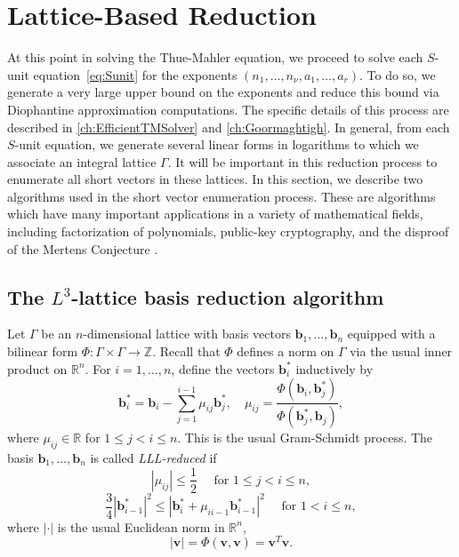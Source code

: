 \section{Lattice-Based Reduction}
\label{sec:LatticeReduction}


At this point in solving the Thue-Mahler equation, we proceed to solve each $S$-unit equation~\eqref{eq:Sunit} for the exponents $(n_1, \dots, n_{\nu}, a_1, \dots, a_r)$. To do so, we generate a very large upper bound on the exponents and reduce this bound via Diophantine approximation computations. The specific details of this process are described in \autoref{ch:EfficientTMSolver} and \autoref{ch:Goormaghtigh}. In general, from each $S$-unit equation, we generate several linear forms in logarithms to which we associate an integral lattice $\Gamma$. It will be important in this reduction process to enumerate all short vectors in these lattices. In this section, we describe two algorithms used in the short vector enumeration process. These are algorithms which have many important applications in a variety of mathematical fields, including factorization of polynomials, public-key cryptography, and the disproof of the Mertens Conjecture . 


\subsection{The $L^3$-lattice basis reduction algorithm}
\label{subsec:LLL}

Let $\Gamma$ be an $n$-dimensional lattice with basis vectors $\mathbf{b}_1, \dots, \mathbf{b}_n$ equipped with a bilinear form $\Phi: \Gamma \times \Gamma \to \mathbb{Z}$. Recall that $\Phi$ defines a norm on $\Gamma$ via the usual inner product on $\mathbb{R}^n$. For $i = 1, \dots, n$, define the vectors $\mathbf{b}_i^*$ inductively by
\[\mathbf{b}_i^* = \mathbf{b}_i - \sum_{j=1}^{i-1}\mu_{ij}\mathbf{b}_j^*, \quad \mu_{ij} = \frac{\Phi(\mathbf{b}_i,\mathbf{b}_j^*)}{\Phi(\mathbf{b}_j^*,\mathbf{b}_j)},\]
where $\mu_{ij} \in \mathbb{R}$ for $1\leq j < i \leq n$. This is the usual Gram-Schmidt process. The basis $\mathbf{b}_1,\dots, \mathbf{b}_n$ is called \textit{LLL-reduced} if
\[|\mu_{ij}| \leq \frac{1}{2} \quad \text{ for } 1\leq j < i \leq n, \]
\[\frac{3}{4}|\mathbf{b}_{i-1}^*|^2 \leq |\mathbf{b}_i^* + \mu_{ii-1}\mathbf{b}_{i-1}^*|^2 \quad \text{ for } 1 <i \leq n,\]
where $| \cdot |$ is the usual Euclidean norm in $\mathbb{R}^n$, 
\[|\mathbf{v}| = \Phi(\mathbf{v},\mathbf{v}) = \mathbf{v}^{T}\mathbf{v}.\]

